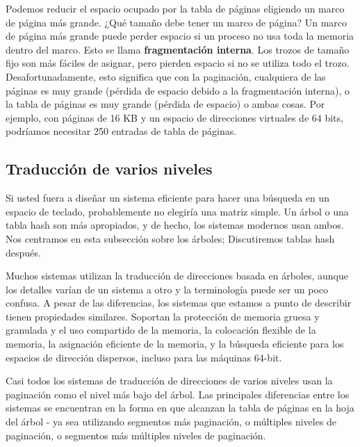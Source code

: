 \documentclass[10pt]{book}
\begin{document}
Podemos reducir el espacio ocupado por la tabla de páginas eligiendo un marco de página más grande. ¿Qué tamaño debe tener un marco de página? Un marco de página más grande puede perder espacio si un proceso no usa toda la memoria dentro del marco. Esto se llama \textbf{fragmentación interna}. Los trozos de tamaño fijo son más fáciles de asignar, pero pierden espacio si no se utiliza todo el trozo. Desafortunadamente, esto significa que con la paginación, cualquiera de las páginas es muy grande (pérdida de espacio debido a la fragmentación interna), o la tabla de páginas es muy grande (pérdida de espacio) o ambas cosas. Por ejemplo, con páginas de 16 KB y un espacio de direcciones virtuales de 64 bits, podríamos necesitar 250 entradas de tabla de páginas.

\subsection{Traducción de varios niveles}
Si usted fuera a diseñar un sistema eficiente para hacer una búsqueda en un espacio de teclado, probablemente no elegiría una matriz simple. Un árbol o una tabla hash son más apropiados, y de hecho, los sistemas modernos usan ambos. Nos centramos en esta subsección sobre los árboles; Discutiremos tablas hash después.

Muchos sistemas utilizan la traducción de direcciones basada en árboles, aunque los detalles varían de un sistema a otro y la terminología puede ser un poco confusa. A pesar de las diferencias, los sistemas que estamos a punto de describir tienen propiedades similares. Soportan la protección de memoria gruesa y granulada y el uso compartido de la memoria, la colocación flexible de la memoria, la asignación eficiente de la memoria, y la búsqueda eficiente para los espacios de dirección dispersos, incluso para las máquinas 64-bit.

Casi todos los sistemas de traducción de direcciones de varios niveles usan la paginación como el nivel más bajo del árbol. Las principales diferencias entre los sistemas se encuentran en la forma en que alcanzan la tabla de páginas en la hoja del árbol - ya sea utilizando segmentos más paginación, o múltiples niveles de paginación, o segmentos más múltiples niveles de paginación. 
\end{document}
